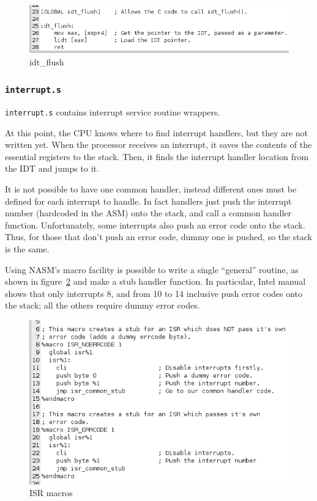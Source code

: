 \documentclass{report}
\begin{document}
\begin{figure}[hbtp]
\centering
\includegraphics[scale=0.4]{images/es02/idt_flush.png}
\caption{idt\_flush}
\label{idt_flush}
\end{figure}

\subsubsection*{\texttt{interrupt.s}}
\texttt{interrupt.s} contains interrupt service routine wrappers.

At this point, the CPU knows where to find interrupt handlers, but they are not written yet. When the processor receives an interrupt, it saves the contents of the essential registers to the stack. Then, it finds the interrupt handler location from the IDT and jumps to it.

It is not possible to have one common handler, instead different ones must be defined for each interrupt to handle. In fact handlers just push the interrupt number (hardcoded in the ASM) onto the stack, and call a common handler function. Unfortunately, some interrupts also push an error code onto the stack. Thus, for those that don't push an error code, dummy one is pushed, so the stack is the same.

Using NASM's macro facility is possible to write a single ``general'' routine, as shown in figure~\ref{isr_macros} and make a stub handler function. In particular, Intel manual shows that only interrupts 8, and from 10 to 14 inclusive push error codes onto the stack; all the others require dummy error codes.

\begin{figure}[hbtp]
\centering
\includegraphics[scale=0.4]{images/es02/isr_macros.png}
\caption{ISR macros}
\label{isr_macros}
\end{figure}
\end{document}
